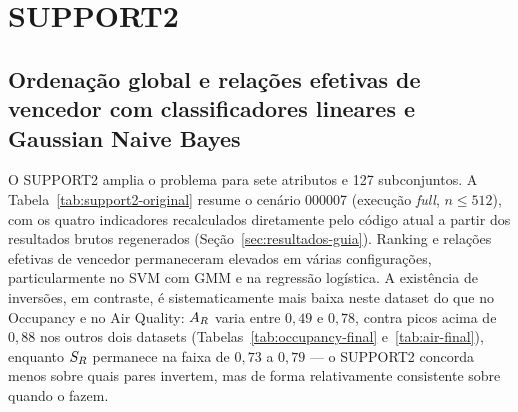\section{SUPPORT2}

\subsection{Ordenação global e relações efetivas de vencedor com classificadores lineares e Gaussian Naive Bayes}

O SUPPORT2 amplia o problema para sete atributos e 127 subconjuntos. A Tabela~\ref{tab:support2-original} resume o cenário 000007 (execução \textit{full}, $n\leq512$), com os quatro indicadores recalculados diretamente pelo código atual a partir dos resultados brutos regenerados (Seção~\ref{sec:resultados-guia}). Ranking e relações efetivas de vencedor permaneceram elevados em várias configurações, particularmente no SVM com GMM e na regressão logística. A existência de inversões, em contraste, é sistematicamente mais baixa neste dataset do que no Occupancy e no Air Quality: $A_R$ varia entre $0{,}49$ e $0{,}78$, contra picos acima de $0{,}88$ nos outros dois datasets (Tabelas~\ref{tab:occupancy-final} e~\ref{tab:air-final}), enquanto $S_R$ permanece na faixa de $0{,}73$ a $0{,}79$ --- o SUPPORT2 concorda menos sobre quais pares invertem, mas de forma relativamente consistente sobre quando o fazem.

